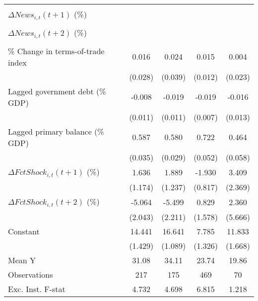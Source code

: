 {\begin{tabular}{l*{4}{c}}
                    &                     &                     &                     &                     \\
\addlinespace
$ \Delta News_{i,t}(t+1)$ (\%)&                     &                     &                     &                     \\
                    &                     &                     &                     &                     \\
\addlinespace
$ \Delta News_{i,t}(t+2)$ (\%)&                     &                     &                     &                     \\
                    &                     &                     &                     &                     \\
\addlinespace
\% Change in terms-of-trade index&       0.016         &       0.024         &       0.015         &       0.004         \\
                    &     (0.028)         &     (0.039)         &     (0.012)         &     (0.023)         \\
\addlinespace
Lagged government debt (\% GDP)&      -0.008         &      -0.019         &      -0.019\sym{**} &      -0.016         \\
                    &     (0.011)         &     (0.011)         &     (0.007)         &     (0.013)         \\
\addlinespace
Lagged primary balance (\% GDP)&       0.587\sym{***}&       0.580\sym{***}&       0.722\sym{***}&       0.464\sym{***}\\
                    &     (0.035)         &     (0.029)         &     (0.052)         &     (0.058)         \\
\addlinespace
$ \Delta FctShock_{i,t}(t+1)$ (\%)&       1.636         &       1.889         &      -1.930\sym{**} &       3.409         \\
                    &     (1.174)         &     (1.237)         &     (0.817)         &     (2.369)         \\
\addlinespace
$ \Delta FctShock_{i,t}(t+2)$ (\%)&      -5.064\sym{**} &      -5.499\sym{**} &       0.829         &       2.360         \\
                    &     (2.043)         &     (2.211)         &     (1.578)         &     (5.666)         \\
\addlinespace
Constant            &      14.441\sym{***}&      16.641\sym{***}&       7.785\sym{***}&      11.833\sym{***}\\
                    &     (1.429)         &     (1.089)         &     (1.326)         &     (1.668)         \\
\midrule
Mean Y              &       31.08         &       34.11         &       23.74         &       19.86         \\
Observations        &         217         &         175         &         469         &          70         \\
Exc. Inst. F-stat   &       4.732         &       4.698         &       6.815         &       1.218         \\
\bottomrule
\end{tabular}
}
